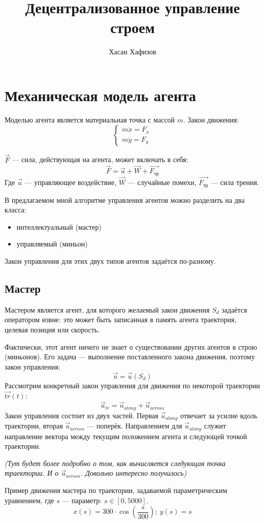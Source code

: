 \documentclass[12pt,a4paper]{article}
\author{Хасан Хафизов}
\title{Децентрализованное управление строем}
\begin{document}
	\maketitle
	
\section{Механическая модель агента}
Моделью агента является материальная точка с массой $m$. Закон движения:
$$\begin{cases} 
m \ddot{x} = F_x \\
m \ddot{y} = F_y \end{cases}
$$

$\vec{F}$ — сила, действующая на агента, может включать в себя:
$$ \vec{F} = \vec{u} + \vec{W} + \vec{F_{\text{тр}}}$$
Где $\vec{u}$ — управляющее воздействие, $\vec{W}$ — случайные помехи, $\vec{F_{\text{тр}}}$ — сила трения.
\par
В предлагаемом мной алгоритме управления агентов можно разделить на два класса:
\begin{itemize}
	\item интеллектуальный (мастер)
	\item управляемый (миньон)
\end{itemize}
Закон управления для этих двух типов агентов задаётся по-разному.
\subsection{Мастер}
Мастером является агент, для которого желаемый закон движения $S_d$ задаётся оператором извне: это может быть записанная в память агента траектория, целевая позиция или скорость. \par
Фактически, этот агент ничего не знает о существовании других агентов в строю (миньонов). Его задача — выполнение поставленного закона движения, поэтому закон управления:
$$ \vec{u} = \vec{u}(S_d)$$
Рассмотрим конкретный закон управления для движения по некоторой траектории $\vec{tr}(t)$:
$$ \vec{u}_{tr} = \vec{u}_{along} + \vec{u}_{across} $$
Закон управления состоит из двух частей. Первая $\vec{u}_{along}$ отвечает за усилие вдоль траектории, вторая $\vec{u}_{across}$ — поперёк. Направлением для $\vec{u}_{along}$ служит направление вектора между текущим положением агента и следующей точкой траектории.
\begin{center}{\textit{ (Тут будет более подробно о том, как вычисляется следующая точка траектории. И о $\vec{u}_{across}$. Довольно интересно получилось)}}
\end{center}
Пример движения мастера по траектории, задаваемой параметрическим уравнением, где $s$ — параметр: $s \in [0, 5000]$.
$$x(s) = 300 \cdot \cos(\frac{s}{300}); \ y(s) = s$$
\end{document}
